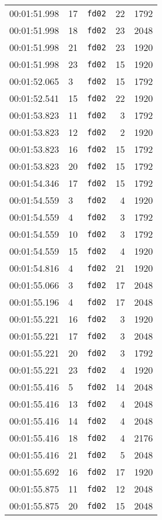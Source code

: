 \documentclass{article}
\begin{document}
\begin{longtable}{lllrr}
00:01:51.998 & 17 & \texttt{fd02} & 22 & 1792 \\
00:01:51.998 & 18 & \texttt{fd02} & 23 & 2048 \\
00:01:51.998 & 21 & \texttt{fd02} & 23 & 1920 \\
00:01:51.998 & 23 & \texttt{fd02} & 15 & 1920 \\
00:01:52.065 & 3 & \texttt{fd02} & 15 & 1792 \\
00:01:52.541 & 15 & \texttt{fd02} & 22 & 1920 \\
00:01:53.823 & 11 & \texttt{fd02} & 3 & 1792 \\
00:01:53.823 & 12 & \texttt{fd02} & 2 & 1920 \\
00:01:53.823 & 16 & \texttt{fd02} & 15 & 1792 \\
00:01:53.823 & 20 & \texttt{fd02} & 15 & 1792 \\
00:01:54.346 & 17 & \texttt{fd02} & 15 & 1792 \\
00:01:54.559 & 3 & \texttt{fd02} & 4 & 1920 \\
00:01:54.559 & 4 & \texttt{fd02} & 3 & 1792 \\
00:01:54.559 & 10 & \texttt{fd02} & 3 & 1792 \\
00:01:54.559 & 15 & \texttt{fd02} & 4 & 1920 \\
00:01:54.816 & 4 & \texttt{fd02} & 21 & 1920 \\
00:01:55.066 & 3 & \texttt{fd02} & 17 & 2048 \\
00:01:55.196 & 4 & \texttt{fd02} & 17 & 2048 \\
00:01:55.221 & 16 & \texttt{fd02} & 3 & 1920 \\
00:01:55.221 & 17 & \texttt{fd02} & 3 & 2048 \\
00:01:55.221 & 20 & \texttt{fd02} & 3 & 1792 \\
00:01:55.221 & 23 & \texttt{fd02} & 4 & 1920 \\
00:01:55.416 & 5 & \texttt{fd02} & 14 & 2048 \\
00:01:55.416 & 13 & \texttt{fd02} & 4 & 2048 \\
00:01:55.416 & 14 & \texttt{fd02} & 4 & 2048 \\
00:01:55.416 & 18 & \texttt{fd02} & 4 & 2176 \\
00:01:55.416 & 21 & \texttt{fd02} & 5 & 2048 \\
00:01:55.692 & 16 & \texttt{fd02} & 17 & 1920 \\
00:01:55.875 & 11 & \texttt{fd02} & 12 & 2048 \\
00:01:55.875 & 20 & \texttt{fd02} & 15 & 2048 \\

\end{longtable}
\end{document}
